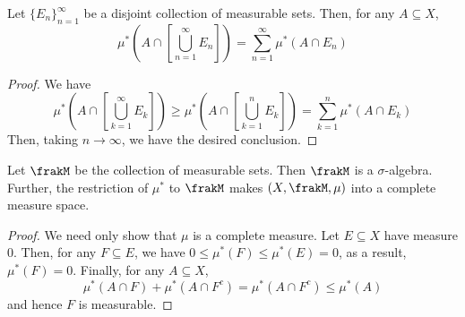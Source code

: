 \begin{proposition}
    Let $\{E_n\}_{n = 1}^\infty$ be a disjoint collection of measurable sets. Then, for any $A\subseteq X$,
    \begin{equation*}
        \mu^*\left(A\cap\left[\bigcup_{n = 1}^\infty E_n\right]\right) = \sum_{n = 1}^\infty\mu^*(A\cap E_n)
    \end{equation*}
\end{proposition}
\begin{proof}
    We have 
    \begin{equation*}
        \mu^*\left(A\cap\left[\bigcup_{k = 1}^\infty E_k\right]\right)\ge\mu^*\left(A\cap\left[\bigcup_{k = 1}^n E_k\right]\right) = \sum_{k = 1}^n\mu^*(A\cap E_k)
    \end{equation*}
    Then, taking $n\to\infty$, we have the desired conclusion.
\end{proof}

\begin{corollary}
    Let $\frakM$ be the collection of measurable sets. Then $\frakM$ is a $\sigma$-algebra. Further, the restriction of $\mu^*$ to $\frakM$ makes $(X,\frakM,\mu)$ into a complete measure space.
\end{corollary}
\begin{proof}
    We need only show that $\mu$ is a complete measure. Let $E\subseteq X$ have measure $0$. Then, for any $F\subseteq E$, we have $0\le\mu^*(F)\le\mu^*(E) = 0$, as a result, $\mu^*(F) = 0$. Finally, for any $A\subseteq X$, 
    \begin{equation*}
        \mu^*(A\cap F) + \mu^*(A\cap F^c) = \mu^*(A\cap F^c)\le\mu^*(A)
    \end{equation*}
    and hence $F$ is measurable.
\end{proof}

